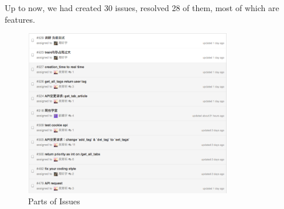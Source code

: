   Up to now, we had created 30 issues, resolved 28 of them, most of which are features.
  \begin{figure}[H]
    \centering
    \includegraphics[width=0.8\textwidth]{figure/issue.png}
    \caption{Parts of Issues\label{fig:issue}}
  \end{figure}
